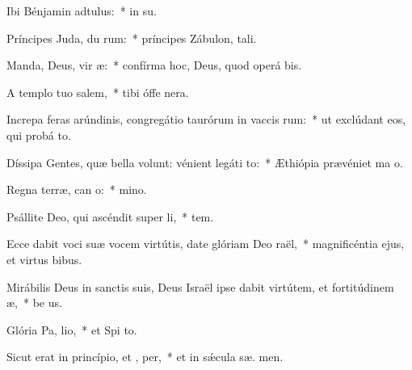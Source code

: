 \item Ibi Bénjamin adtulus:~* in  su.
\item Príncipes Juda, du rum:~* príncipes Zábulon,  tali.
\item Manda, Deus, vir æ:~* confírma hoc, Deus, quod operá   bis.
\item A templo tuo  salem,~* tibi óffe  nera.
\item Increpa feras arúndinis, congregátio taurórum in vaccis rum:~* ut exclúdant eos, qui probá  to.
\item Díssipa Gentes, quæ bella volunt: vénient legáti  to:~* Æthiópia prævéniet ma  o.
\item Regna terræ, can o:~*  mino.
\item Psállite Deo, qui ascéndit super  li,~*  tem.
\item Ecce dabit voci suæ vocem virtútis, date glóriam Deo  raël,~* magnificéntia ejus, et virtus   bibus.
\item Mirábilis Deus in sanctis suis, Deus Israël ipse dabit virtútem, et fortitúdinem  æ,~* be us.
\item Glória Pa,  lio,~* et Spi to.
\item Sicut erat in princípio, et ,  per,~* et in sǽcula sæ. men.
